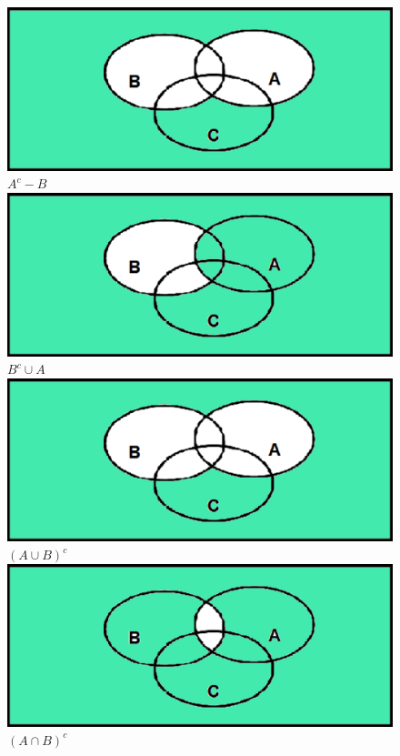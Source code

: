 \documentclass[12pt]{article}
\begin{document}
	\begin{figure}[h!]
		\includegraphics[scale=0.5]{q8a} $ A^c - B $ \\
		\includegraphics[scale=0.5]{q8b} $ B^c \cup A $ \\
		\includegraphics[scale=0.5]{q8c} $ (A \cup B)^c $ \\
		\includegraphics[scale=0.5]{q8d} $ (A \cap B)^c $ \\

\end{figure}
\end{document}
